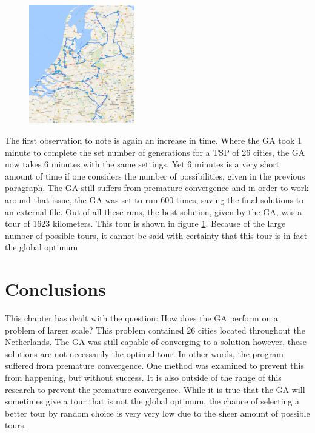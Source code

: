 \begin{figure}
	\vspace{-0.4cm}
	\centering
		\includegraphics[width=0.41\textwidth]{1623tour}	
	\label{1623tour}
\end{figure}

\par
The first observation to note is again an increase in time. Where the GA took 1 minute to complete the set number of generations for a TSP of 26 cities, the GA now takes 6 minutes with the same settings. Yet 6 minutes is a very short amount of time if one considers the number of possibilities, given in the previous paragraph. The GA still suffers from premature convergence and in order to work around that issue, the GA was set to run 600 times, saving the final solutions to an external file. Out of all these runs, the best solution, given by the GA, was a tour of 1623 kilometers. This tour is shown in figure \ref{1623tour}. Because of the large number of possible tours, it cannot be said with certainty that this tour is in fact the global optimum 


\section{Conclusions}
\par
This chapter has dealt with the question: How does the GA perform on a problem of larger scale? This problem contained 26 cities located throughout the Netherlands. The GA was still capable of converging to a solution however, these solutions are not necessarily the optimal tour. In other words, the program suffered from premature convergence. One method was examined to prevent this from happening, but without success. It is also outside of the range of this research to prevent the premature convergence. While it is true that the GA will sometimes give a tour that is not the global optimum, the chance of selecting a better tour by random choice is very very low due to the sheer amount of possible tours. 

